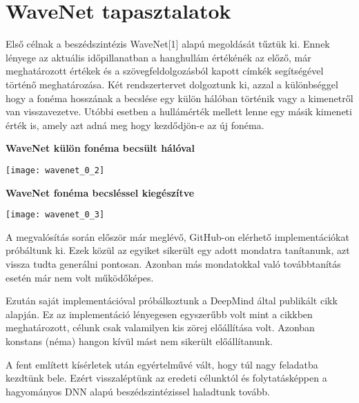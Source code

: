 \section{WaveNet tapasztalatok}

Első célnak a beszédszintézis WaveNet[1] alapú megoldását tűztük ki. Ennek lényege az aktuális időpillanatban a hanghullám értékénék az előző, már meghatározott értékek és a szövegfeldolgozásból kapott címkék segítségével történő meghatározása. Két rendszertervet dolgoztunk ki, azzal a különbséggel hogy a fonéma hosszának a becslése egy külön hálóban történik vagy a kimenetről van visszavezetve. Utóbbi esetben a hullámérték mellett lenne egy másik kimeneti érték is, amely azt adná meg hogy kezdődjön-e az új fonéma.

\begin{centering}
	\textbf{WaveNet külön fonéma becsült hálóval}\par\medskip\centering
	\texttt{[image: wavenet\_0\_2]}
	
	\textbf{WaveNet fonéma becsléssel kiegészítve}\par\medskip
	\texttt{[image: wavenet\_0\_3]}
\end{centering}

A megvalósítás során először már meglévő, GitHub-on elérhető implementációkat próbáltunk ki. Ezek közül az egyiket sikerült egy adott mondatra tanítanunk, azt vissza tudta generálni pontosan. Azonban más mondatokkal való továbbtanítás esetén már nem volt működőképes.

Ezután saját implementációval próbálkoztunk a DeepMind által publikált cikk alapján. Ez az implementáció lényegesen egyszerűbb volt mint a cikkben meghatározott, célunk csak valamilyen kis zörej előállítása volt. Azonban konstans (néma) hangon kívül mást nem sikerült előállítanunk.

A fent említett kísérletek után egyértelművé vált, hogy túl nagy feladatba kezdtünk bele. Ezért visszaléptünk az eredeti célunktól és folytatásképpen a hagyományos DNN alapú beszédszintézissel haladtunk tovább.